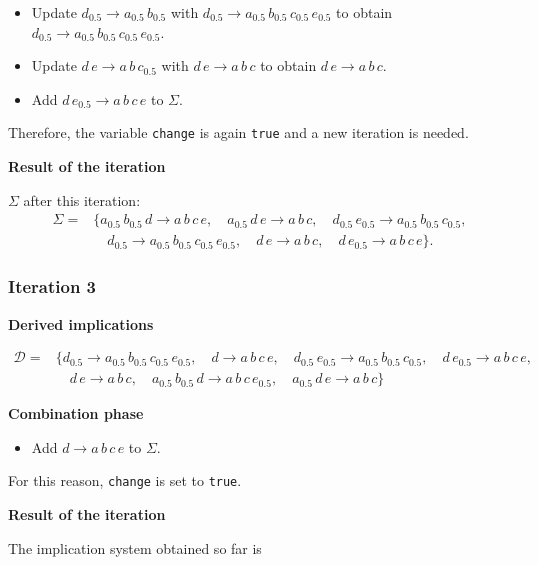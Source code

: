 \documentclass[
  letterpaper,
  DIV=11,
  numbers=noendperiod]{scrartcl}
\providecommand{\tightlist}{%
  \setlength{\itemsep}{0pt}\setlength{\parskip}{0pt}}\usepackage{longtable,booktabs,array}
\begin{document}
\begin{itemize}
\tightlist
\item
  Update \(d_{0.5} \to a_{0.5}\,b_{0.5}\) with
  \(d_{0.5} \to a_{0.5}\,b_{0.5}\,c_{0.5}\,e_{0.5}\) to obtain
  \(d_{0.5} \to a_{0.5}\,b_{0.5}\,c_{0.5}\,e_{0.5}\).
\item
  Update \(d\,e \to a\,b\,c_{0.5}\) with \(d\,e \to a\,b\,c\) to obtain
  \(d\,e \to a\,b\,c\).
\item
  Add \(d\,e_{0.5} \to a\,b\,c\,e\) to \(\Sigma\).
\end{itemize}

Therefore, the variable \texttt{change} is again \texttt{true} and a new
iteration is needed.

\textbf{Result of the iteration}

\(\Sigma\) after this iteration: \begin{align*}
\Sigma = & \big\{a_{0.5}\,b_{0.5}\,d \to a\,b\,c\,e,\quad 
a_{0.5}\,d\,e \to a\,b\,c,\quad 
d_{0.5}\,e_{0.5} \to a_{0.5}\,b_{0.5}\,c_{0.5},\\
& \quad d_{0.5} \to a_{0.5}\,b_{0.5}\,c_{0.5}\,e_{0.5},\quad d\,e \to a\,b\,c,\quad d\,e_{0.5} \to a\,b\,c\,e\big\}.
\end{align*}

\subsubsection{Iteration 3}\label{iteration-3}

\textbf{Derived implications}

\begin{align*}
\mathcal D = & \big\{
d_{0.5} \to a_{0.5}\,b_{0.5}\,c_{0.5}\,e_{0.5},\quad  
d \to a\,b\,c\,e,\quad 
d_{0.5}\,e_{0.5} \to a_{0.5}\,b_{0.5}\,c_{0.5},\quad 
d\,e_{0.5} \to a\,b\,c\,e, \\
& \quad d\,e \to a\,b\,c,\quad 
a_{0.5}\,b_{0.5}\,d \to a\,b\,c\,e_{0.5},\quad 
a_{0.5}\,d\,e \to a\,b\,c\big\}
\end{align*}

\textbf{Combination phase}

\begin{itemize}
\tightlist
\item
  Add \(d \to a\,b\,c\,e\) to \(\Sigma\).
\end{itemize}

For this reason, \texttt{change} is set to \texttt{true}.

\textbf{Result of the iteration}

The implication system obtained so far is
\end{document}
